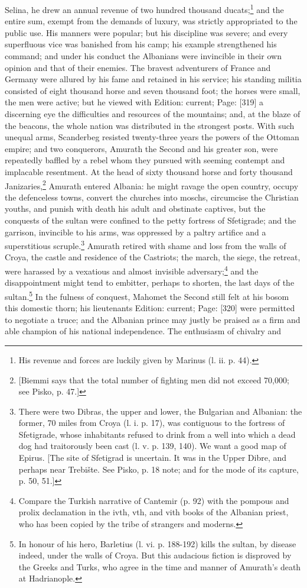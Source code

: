 Selina, he drew an annual revenue of two hundred thousand ducats;\footnote{His revenue and forces are luckily given by Marinus (l. ii. p. 44).} and the entire sum, exempt from the demands of luxury, was strictly appropriated to the public use. His manners were popular; but his discipline was severe; and every superfluous vice was banished from his camp; his example strengthened his command; and under his conduct the Albanians were invincible in their own opinion and that of their enemies. The bravest adventurers of France and Germany were allured by his fame and retained in his service; his standing militia consisted of eight thousand horse and seven thousand foot; the horses were small, the men were active; but he viewed with Edition: current; Page: [319] a discerning eye the difficulties and resources of the mountains; and, at the blaze of the beacons, the whole nation was distributed in the strongest posts. With such unequal arms, Scanderbeg resisted twenty-three years the powers of the Ottoman empire; and two conquerors, Amurath the Second and his greater son, were repeatedly baffled by a rebel whom they pursued with seeming contempt and implacable resentment. At the head of sixty thousand horse and forty thousand Janizaries,\footnote{[Biemmi says that the total number of fighting men did not exceed 70,000; see Pisko, p. 47.]} Amurath entered Albania: he might ravage the open country, occupy the defenceless towns, convert the churches into moschs, circumcise the Christian youths, and punish with death his adult and obstinate captives, but the conquests of the sultan were confined to the petty fortress of Sfetigrade; and the garrison, invincible to his arms, was oppressed by a paltry artifice and a superstitious scruple.\footnote{There were two Dibras, the upper and lower, the Bulgarian and Albanian: the former, 70 miles from Croya (l. i. p. 17), was contiguous to the fortress of Sfetigrade, whose inhabitants refused to drink from a well into which a dead dog had traitorously been cast (l. v. p. 139, 140). We want a good map of Epirus. [The site of Sfetigrad is uncertain. It was in the Upper Dibre, and perhaps near Trebište. See Pisko, p. 18 note; and for the mode of its capture, p. 50, 51.]} Amurath retired with shame and loss from the walls of Croya, the castle and residence of the Castriots; the march, the siege, the retreat, were harassed by a vexatious and almost invisible adversary;\footnote{Compare the Turkish narrative of Cantemir (p. 92) with the pompous and prolix declamation in the ivth, vth, and vith books of the Albanian priest, who has been copied by the tribe of strangers and moderns.} and the disappointment might tend to embitter, perhaps to shorten, the last days of the sultan.\footnote{In honour of his hero, Barletius (l. vi. p. 188-192) kills the sultan, by disease indeed, under the walls of Croya. But this audacious fiction is disproved by the Greeks and Turks, who agree in the time and manner of Amurath\texthebrew{}’s death at Hadrianople.} In the fulness of conquest, Mahomet the Second still felt at his bosom this domestic thorn; his lieutenants Edition: current; Page: [320] were permitted to negotiate a truce; and the Albanian prince may justly be praised as a firm and able champion of his national independence. The enthusiasm of chivalry and 